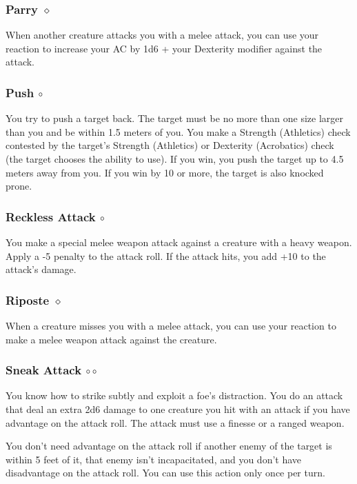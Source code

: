\subsubsection{Parry $\diamond$} \label{act::parry}
    When another creature attacks you with a melee attack, you can use your reaction to increase your AC by 1d6 + your Dexterity modifier against the attack.

\subsubsection{Push $\circ$} \label{act::push}
    You try to push a target back.
    The target must be no more than one size larger than you and be within 1.5 meters of you.
    You make a Strength (Athletics) check contested by the target's Strength (Athletics) or Dexterity (Acrobatics) check (the target chooses the ability to use).
    If you win, you push the target up to 4.5 meters away from you.
    If you win by 10 or more, the target is also knocked prone.

\subsubsection{Reckless Attack $\circ$} \label{act::recklessattack}
    You make a special melee weapon attack against a creature with a heavy weapon.
    Apply a -5 penalty to the attack roll.
    If the attack hits, you add +10 to the attack's damage.

\subsubsection{Riposte $\diamond$} \label{act::riposte}
    When a creature misses you with a melee attack, you can use your reaction to make a melee weapon attack against the creature.

\subsubsection{Sneak Attack $\circ\circ$} \label{act::sneakattack}
    You know how to strike subtly and exploit a foe's distraction.
    You do an attack that deal an extra 2d6 damage to one creature you hit with an attack if you have advantage on the attack roll.
    The attack must use a finesse or a ranged weapon.

    You don't need advantage on the attack roll if another enemy of the target is within 5 feet of it, that enemy isn't incapacitated, and you don't have disadvantage on the attack roll.
    You can use this action only once per turn.

